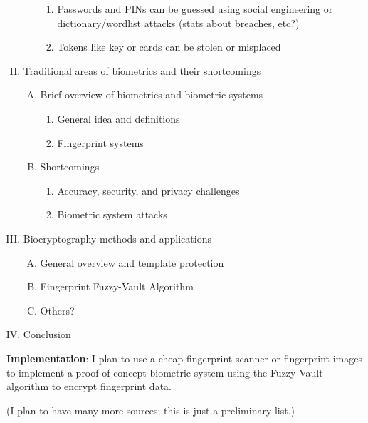 \documentclass[11pt]{article}
\begin{document}
\begin{enumerate}[I.]
\begin{enumerate}[A.]
\begin{enumerate}[1.]
        \item Passwords and PINs can be guessed using social engineering or dictionary/wordlist attacks (stats about breaches, etc?)
        \item Tokens like key or cards can be stolen or misplaced
        \end{enumerate}
    \end{enumerate}
\item Traditional areas of biometrics and their shortcomings
     \begin{enumerate}[A.]
    \item Brief overview of biometrics and biometric systems 
        \begin{enumerate}[1.]
        \item General idea and definitions
        \item Fingerprint systems
        \end{enumerate}
    \item Shortcomings 
        \begin{enumerate}[1.]
        \item Accuracy, security, and privacy challenges
        \item Biometric system attacks
        \end{enumerate}
    \end{enumerate}
\item Biocryptography methods and applications
    \begin{enumerate}[A.]
    \item General overview and template protection
    \item Fingerprint Fuzzy-Vault Algorithm
    \item Others?
    \end{enumerate}
\item Conclusion
\end{enumerate}

\textbf{Implementation}: I plan to use a cheap fingerprint scanner or fingerprint images to implement a proof-of-concept biometric system using the Fuzzy-Vault algorithm to encrypt fingerprint data.
\nocite{*}
{}


(I plan to have many more sources; this is just a preliminary list.)
\end{document}

